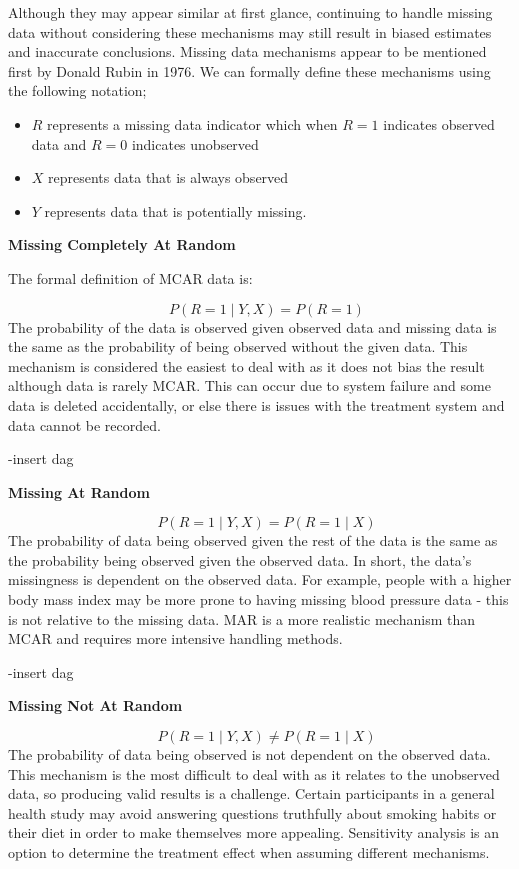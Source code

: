 \documentclass{article}
\providecommand{\tightlist}{%
  \setlength{\itemsep}{0pt}\setlength{\parskip}{0pt}}
\begin{document}
Although they may appear similar at first glance, continuing to handle
missing data without considering these mechanisms may still result in
biased estimates and inaccurate conclusions. Missing data mechanisms
appear to be mentioned first by Donald Rubin in 1976. We can formally
define these mechanisms using the following notation;

\begin{itemize}
\tightlist
\item
  \(R\) represents a missing data indicator which when \(R=1\) indicates
  observed data and \(R=0\) indicates unobserved
\item
  \(X\) represents data that is always observed
\item
  \(Y\) represents data that is potentially missing.
\end{itemize}

\textbf{Missing Completely At Random}

The formal definition of MCAR data is:

\[\quad P(R = 1 \mid Y, X) = P(R = 1)\] The probability of the data is
observed given observed data and missing data is the same as the
probability of being observed without the given data. This mechanism is
considered the easiest to deal with as it does not bias the result
although data is rarely MCAR. This can occur due to system failure and
some data is deleted accidentally, or else there is issues with the
treatment system and data cannot be recorded.

-insert dag

\textbf{Missing At Random}

\[\quad P(R = 1 \mid Y, X) = P(R = 1 \mid X)\] The probability of data
being observed given the rest of the data is the same as the probability
being observed given the observed data. In short, the data's missingness
is dependent on the observed data. For example, people with a higher
body mass index may be more prone to having missing blood pressure data
- this is not relative to the missing data. MAR is a more realistic
mechanism than MCAR and requires more intensive handling methods.

-insert dag

\textbf{Missing Not At Random}

\[\quad P(R = 1 \mid Y, X) \ne P(R = 1 \mid X)\] The probability of data
being observed is not dependent on the observed data. This mechanism is
the most difficult to deal with as it relates to the unobserved data, so
producing valid results is a challenge. Certain participants in a
general health study may avoid answering questions truthfully about
smoking habits or their diet in order to make themselves more appealing.
Sensitivity analysis is an option to determine the treatment effect when
assuming different mechanisms.
\end{document}
